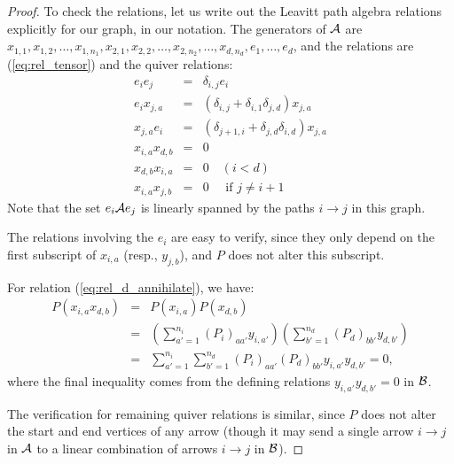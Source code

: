 \documentclass[11pt]{article}
\begin{document}
\begin{proof}
To check the relations, let us write out the Leavitt path algebra relations explicitly for our graph, in our notation. The generators of $\mathcal{A}$ are $x_{1,1}, x_{1,2}, \dotsc, x_{1,n_1}, x_{2,1}, x_{2,2}, \dotsc, x_{2,n_2}, \dotsc, x_{d,n_d}, e_1, \dotsc, e_d$, and the relations are (\ref{eq:rel_tensor}) and the quiver relations:
\begin{eqnarray}
e_i e_j & = & \delta_{i,j} e_i \nonumber \\
e_i x_{j,a} & = & (\delta_{i,j} + \delta_{i,1}\delta_{j,d}) x_{j,a} \nonumber \\
x_{j,a} e_i & = & (\delta_{j+1,i} + \delta_{j,d}\delta_{i,d}) x_{j,a} \nonumber \\
x_{i,a} x_{d,b} & = & 0 \label{eq:rel_d_annihilate} \\
x_{d,b} x_{i,a} & = & 0 \quad (i < d) \nonumber \\
x_{i,a} x_{j,b} & = & 0 \quad \text{ if } j \neq i+1 \nonumber 
\end{eqnarray}
Note that the set $e_i \mathcal{A} e_j$ is linearly spanned by the paths $i \to j$ in this graph.

The relations involving the $e_i$ are easy to verify, since they only depend on the first subscript of $x_{i,a}$ (resp., $y_{j,b}$), and $P$ does not alter this subscript. 

For relation (\ref{eq:rel_d_annihilate}), we have:
\begin{eqnarray*}
P(x_{i,a} x_{d,b}) & = & P(x_{i,a}) P(x_{d,b}) \\
& = & \left(\sum_{a'=1}^{n_i} (P_i)_{aa'} y_{i,a'}\right)\left(\sum_{b'=1}^{n_d} (P_d)_{bb'} y_{d,b'}\right) \\
& = & \sum_{a'=1}^{n_i} \sum_{b'=1}^{n_d} (P_i)_{aa'} (P_d)_{bb'} y_{i,a'} y_{d,b'} = 0,
\end{eqnarray*}
where the final inequality comes from the defining relations $y_{i,a'} y_{d,b'} = 0$ in $\mathcal{B}$.

The verification for remaining quiver relations is similar, since $P$ does not alter the start and end vertices of any arrow (though it may send a single arrow $i \to j$ in $\mathcal{A}$ to a linear combination of arrows $i \to j$ in $\mathcal{B}$).


\end{proof}
\end{document}
